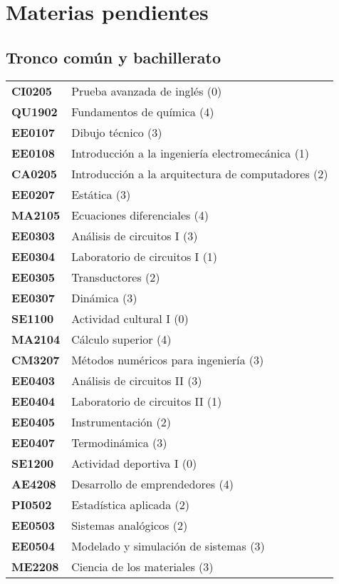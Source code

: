 \documentclass[letterpaper]{article}%
\begin{document}
%
\section*{Materias pendientes}%
\label{sec:Materiaspendientes}%
\subsection*{Tronco común y bachillerato}%
\label{subsec:Troncocomnybachillerato}%
\begin{tabularx}{\textwidth}{p{1.5cm}p{10cm}}%
\textbf{CI0205}&Prueba avanzada de inglés (0)\\%
\textbf{QU1902}&Fundamentos de química (4)\\%
\textbf{EE0107}&Dibujo técnico (3)\\%
\textbf{EE0108}&Introducción a la ingeniería electromecánica (1)\\%
\textbf{CA0205}&Introducción a la arquitectura de computadores (2)\\%
\textbf{EE0207}&Estática (3)\\%
\textbf{MA2105}&Ecuaciones diferenciales (4)\\%
\textbf{EE0303}&Análisis de circuitos I (3)\\%
\textbf{EE0304}&Laboratorio de circuitos I (1)\\%
\textbf{EE0305}&Transductores (2)\\%
\textbf{EE0307}&Dinámica (3)\\%
\textbf{SE1100}&Actividad cultural I (0)\\%
\textbf{MA2104}&Cálculo superior (4)\\%
\textbf{CM3207}&Métodos numéricos para ingeniería (3)\\%
\textbf{EE0403}&Análisis de circuitos II (3)\\%
\textbf{EE0404}&Laboratorio de circuitos II (1)\\%
\textbf{EE0405}&Instrumentación (2)\\%
\textbf{EE0407}&Termodinámica (3)\\%
\textbf{SE1200}&Actividad deportiva I (0)\\%
\textbf{AE4208}&Desarrollo de emprendedores (4)\\%
\textbf{PI0502}&Estadística aplicada (2)\\%
\textbf{EE0503}&Sistemas analógicos (2)\\%
\textbf{EE0504}&Modelado y simulación de sistemas (3)\\%
\textbf{ME2208}&Ciencia de los materiales (3)\\%

\end{tabularx}
\end{document}
